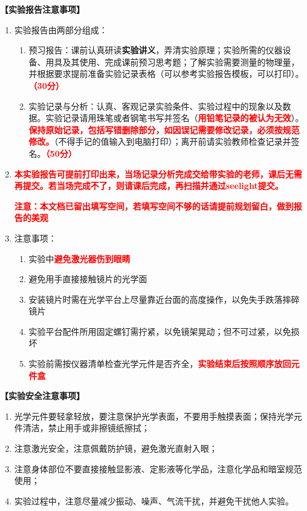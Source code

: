 \documentclass[dvipsnames, svgnames,a4paper,11pt]{article}
\begin{document}
	\textbf{【实验报告注意事项】}
	\begin{enumerate}[label=\arabic*., leftmargin=*]
		\item 实验报告由两部分组成：
		\begin{enumerate}[label=\arabic*), leftmargin=*]
			\item 预习报告：课前认真研读\textbf{实验讲义}，弄清实验原理；实验所需的仪器设备、用具及其使用、完成课前预习思考题；了解实验需要测量的物理量，并根据要求提前准备实验记录表格（可以参考实验报告模板，可以打印）。\textcolor{red}{\textbf{（30分）}}
			\item 实验记录与分析：认真、客观记录实验条件、实验过程中的现象以及数据。实验记录请用珠笔或者钢笔书写并签名（\textcolor{red}{\textbf{用铅笔记录的被认为无效}}）。\textcolor{red}{\textbf{保持原始记录，包括写错删除部分，如因误记需要修改记录，必须按规范修改。}}（不得手记的值输入到电脑打印）；离开前请实验教师检查记录并签名。\textcolor{red}{\textbf{（50分）}}
		\end{enumerate}
		
		\item \textcolor{red}{\textbf{本实验报告可提前打印出来，当场记录分析完成交给带实验的老师，课后无需再提交。若当场完成不了，则请课后完成，再扫描并通过seelight提交。}}
		
		\textcolor{red}{\textbf{注意：本文档已留出填写空间，若填写空间不够的话请提前规划留白，做到报告的美观}}
		\item 注意事项：
		\begin{enumerate}[label=\arabic*), leftmargin=*]
			\item 实验中\textcolor{red}{\textbf{避免激光器伤到眼睛}}
			\item 避免用手直接接触镜片的光学面
			\item 安装镜片时需在光学平台上尽量靠近台面的高度操作，以免失手跌落摔碎镜片
			\item 实验平台配件所用固定螺钉需拧紧，以免镜架晃动；但不可过紧，以免损坏
			\item 实验前需按仪器清单检查光学元件是否齐全，\textcolor{red}{\textbf{实验结束后按照顺序放回元件盒}}
			
		\end{enumerate}
	\end{enumerate}
	
	\textbf{【实验安全注意事项】}	
	\begin{enumerate}
		\item 光学元件要轻拿轻放，要注意保护光学表面，不要用手触摸表面；保持光学元件清洁，禁止用手或非擦镜纸擦拭；
		\item 注意激光安全，注意佩戴防护镜，避免激光直射入眼；
		\item 注意身体部位不要直接接触显影液、定影液等化学品，注意化学品和暗室规范使用；
		\item 实验过程中，注意尽量减少振动、噪声、气流干扰，并避免干扰他人实验。		
	\end{enumerate}
	
\end{document}
